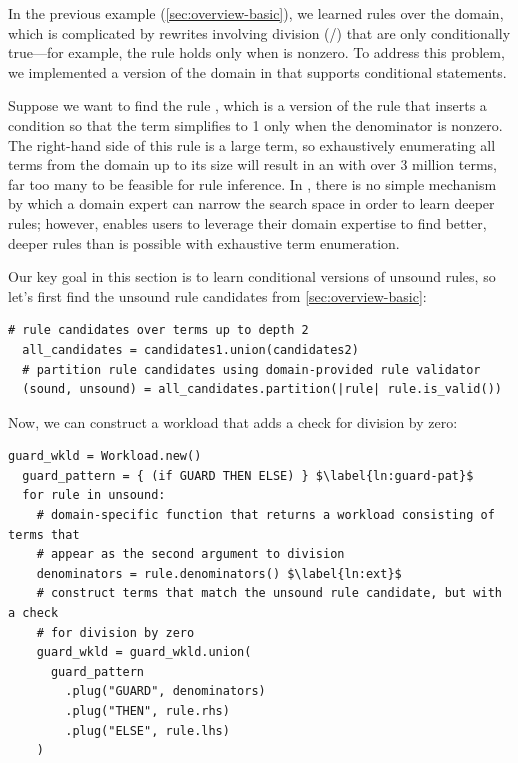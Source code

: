 In the previous example (\autoref{sec:overview-basic}), we learned rules over
the  domain, which is complicated by rewrites involving division (/)
that are only conditionally true---for example, the rule 
holds only when  is nonzero. To address this problem, we implemented
a version of the  domain in \enumo that supports conditional statements.

Suppose we want to find the rule
  ,
  which is a version of the rule
   that inserts
  a condition so that the term simplifies to 1
  only when the denominator is nonzero.
The right-hand side of this rule is a large term, so
  exhaustively enumerating all terms from the domain up to its size will
  result in an \egraph with over 3 million terms, far too many
  to be feasible for rule inference.
In , there is no simple mechanism by which a domain expert can
  narrow the search space in order to learn deeper rules; however,
  \enumo enables users to leverage their domain expertise to find better, deeper
  rules than is possible with exhaustive term enumeration.

Our key goal in this section is to learn conditional versions of unsound rules,
  so let's first find the unsound rule candidates from \autoref{sec:overview-basic}:

\begin{lstlisting}[name=guided]
  # rule candidates over terms up to depth 2
  all_candidates = candidates1.union(candidates2)
  # partition rule candidates using domain-provided rule validator
  (sound, unsound) = all_candidates.partition(|rule| rule.is_valid())
\end{lstlisting}

Now, we can construct a workload that adds a check for
  division by zero:

\pagebreak

\begin{lstlisting}[name=guided]
  guard_wkld = Workload.new()
  guard_pattern = { (if GUARD THEN ELSE) } $\label{ln:guard-pat}$
  for rule in unsound:
    # domain-specific function that returns a workload consisting of terms that
    # appear as the second argument to division
    denominators = rule.denominators() $\label{ln:ext}$
    # construct terms that match the unsound rule candidate, but with a check
    # for division by zero
    guard_wkld = guard_wkld.union(
      guard_pattern
        .plug("GUARD", denominators)
        .plug("THEN", rule.rhs)
        .plug("ELSE", rule.lhs)
    )

\end{lstlisting}

